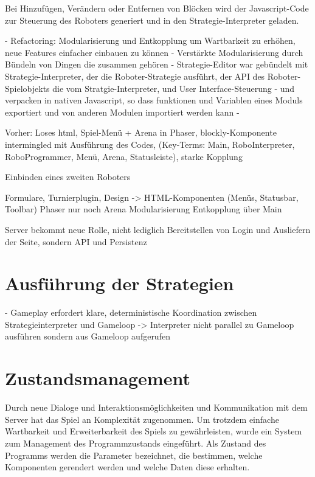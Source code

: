 Bei Hinzufügen, Verändern oder Entfernen von Blöcken wird der Javascript-Code zur Steuerung des
Roboters generiert und in den Strategie-Interpreter geladen.


- Refactoring: Modularisierung und Entkopplung um Wartbarkeit zu erhöhen, neue Features einfacher
einbauen zu können - Verstärkte Modularisierung durch Bündeln von Dingen die zusammen gehören -
Strategie-Editor war gebündelt mit Strategie-Interpreter, der die Roboter-Strategie ausführt, der
API des Roboter-Spielobjekts die vom Stratgie-Interpreter, und User Interface-Steuerung - und
verpacken in nativen Javascript, so dass funktionen und Variablen eines Moduls exportiert und von
anderen Modulen importiert werden kann - 


Vorher: Loses html, Spiel-Menü + Arena in Phaser, blockly-Komponente intermingled mit Ausführung des
Codes, (Key-Terms: Main, RoboInterpreter, RoboProgrammer, Menü, Arena, Statusleiste), starke
Kopplung

Einbinden eines zweiten Roboters

Formulare, Turnierplugin, Design -> HTML-Komponenten (Menüs, Statusbar, Toolbar) Phaser nur noch
Arena Modularisierung Entkopplung über Main

Server bekommt neue Rolle, nicht lediglich Bereitstellen von Login und Ausliefern der Seite, sondern
API und Persistenz

\section{Ausführung der Strategien}

- Gameplay erfordert klare, deterministische Koordination zwischen Strategieinterpreter und Gameloop
-> Interpreter nicht parallel zu Gameloop ausführen sondern aus Gameloop aufgerufen

\section{Zustandsmanagement}

Durch neue Dialoge und Interaktionsmöglichkeiten und Kommunikation mit dem Server hat das Spiel an
Komplexität zugenommen. Um trotzdem einfache Wartbarkeit und Erweiterbarkeit des Spiels zu
gewährleisten, wurde ein System zum Management des Programmzustands eingeführt. Als Zustand des
Programms werden die Parameter bezeichnet, die bestimmen, welche Komponenten gerendert werden und
welche Daten diese erhalten.

